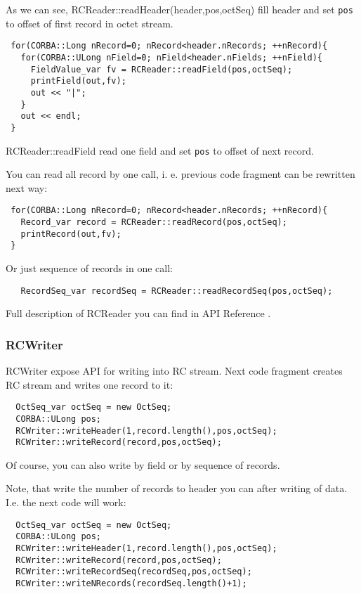 \documentclass[10pt]{article}
\begin{document}
 As we can see, RCReader::readHeader(header,pos,octSeq) fill header
 and set \verb|pos| to offset of first record in octet stream.

\begin{verbatim}
 for(CORBA::Long nRecord=0; nRecord<header.nRecords; ++nRecord){
   for(CORBA::ULong nField=0; nField<header.nFields; ++nField){
     FieldValue_var fv = RCReader::readField(pos,octSeq);
     printField(out,fv);
     out << "|";
   }
   out << endl;
 }
\end{verbatim}

 RCReader::readField read one field and set \verb|pos| to offset of
next record.

 You can read all record by one call, i. e. previous code fragment
 can be rewritten next way:
 
\begin{verbatim}
 for(CORBA::Long nRecord=0; nRecord<header.nRecords; ++nRecord){
   Record_var record = RCReader::readRecord(pos,octSeq);
   printRecord(out,fv);
 }
\end{verbatim}

 Or just sequence of records in one call:

\begin{verbatim}
   RecordSeq_var recordSeq = RCReader::readRecordSeq(pos,octSeq);
\end{verbatim}

 Full description of RCReader you can find in API Reference .

\subsubsection{ RCWriter }

 RCWriter expose API for writing into RC stream. Next code fragment
 creates RC stream and writes one record to it:

\begin{verbatim}
  OctSeq_var octSeq = new OctSeq;
  CORBA::ULong pos;
  RCWriter::writeHeader(1,record.length(),pos,octSeq);
  RCWriter::writeRecord(record,pos,octSeq);
\end{verbatim}

 Of course, you can also write by field or by sequence of records.

 Note, that write the number of records to header you can after writing
of data. I.e. the next code will work:

\begin{verbatim}
  OctSeq_var octSeq = new OctSeq;
  CORBA::ULong pos;
  RCWriter::writeHeader(1,record.length(),pos,octSeq);
  RCWriter::writeRecord(record,pos,octSeq);
  RCWriter::writeRecordSeq(recordSeq,pos,octSeq);
  RCWriter::writeNRecords(recordSeq.length()+1);
\end{verbatim}
\end{document}
